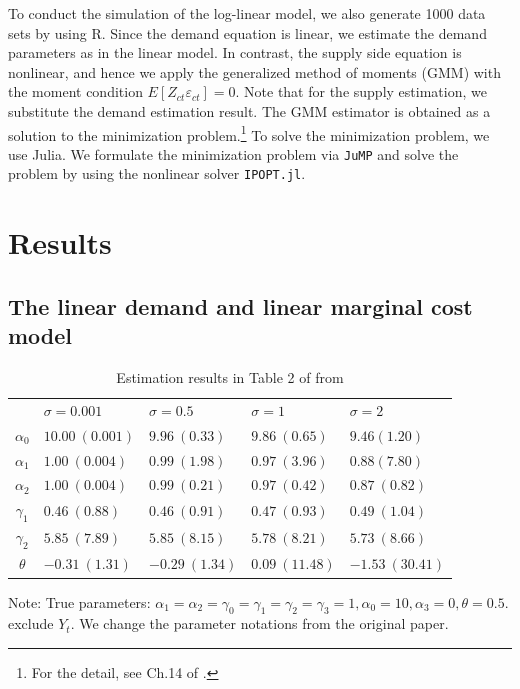 \documentclass[11pt, a4paper]{article}
\begin{document}
To conduct the simulation of the log-linear model, we also generate 1000 data sets by using R. 
Since the demand equation is linear, we estimate the demand parameters as in the linear model.
In contrast, the supply side equation is nonlinear, and hence we apply the generalized method of moments (GMM) with the moment condition $E[Z_{ct} \varepsilon_{ct}] = 0$.
Note that for the supply estimation, we substitute the demand estimation result.
The GMM estimator is obtained as a solution to the minimization problem.\footnote{For the detail, see Ch.14 of \citet{wooldridge2010econometric}.}
To solve the minimization problem, we use Julia.
We formulate the minimization problem via \texttt{JuMP} and solve the problem by using the nonlinear solver \texttt{IPOPT.jl}.



\section{Results}

\subsection{The linear demand and linear marginal cost model}

\begin{table}[!htbp]
    \caption{Estimation results in Table 2 of from \cite{perloff2012collinearity}}
    \label{tb:linear_linear_sigma_Perloff_Shen}
    \begin{center}
        \begin{tabular}{cllll}
            \hline
            & $\sigma=0.001$ & $\sigma=0.5$ & $\sigma=1$ & $\sigma=2$ \\
            $\alpha_0$ & $10.00\ (0.001)$ & $9.96\ (0.33)$ & $9.86\ (0.65)$ & $9.46(1.20)$ \\
            $\alpha_1$ & $1.00\ (0.004)$ & $0.99\ (1.98)$ & $0.97\ (3.96)$ & $0.88(7.80)$ \\
            $\alpha_2$ & $1.00\ (0.004)$ & $0.99\ (0.21)$ & $0.97\ (0.42)$ & $0.87\ (0.82)$ \\
            $\gamma_1$ & $0.46\ (0.88)$ & $0.46\ (0.91)$ & $0.47\ (0.93)$ & $0.49\ (1.04)$ \\
            $\gamma_2$ & $5.85\ (7.89)$ & $5.85\ (8.15)$ & $5.78\ (8.21)$ & $5.73\ (8.66)$ \\
            $\theta$ & $-0.31\ (1.31)$ & $-0.29\ (1.34)$ & $0.09\ (11.48)$ & $-1.53\ (30.41)$ \\
            \hline
        \end{tabular}
    \end{center}\footnotesize
    Note: True parameters: $\alpha_1 = \alpha_2 = \gamma_0 = \gamma_1 = \gamma_2  = \gamma_3 = 1, \alpha_0 = 10, \alpha_3 = 0,  \theta = 0.5$. \citet{perloff2012collinearity} exclude $Y_t$. We change the parameter notations from the original paper.
\end{table}
\end{document}
